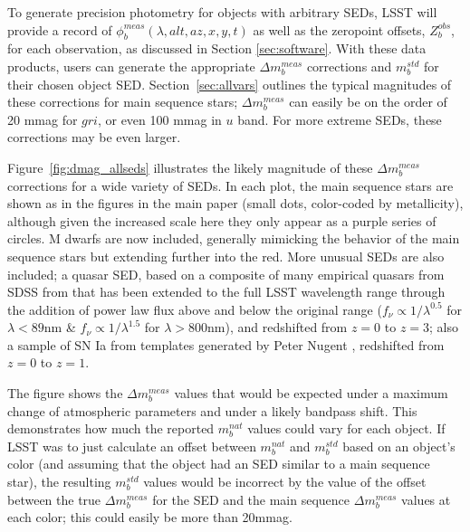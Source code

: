 \documentclass[12pt,preprint]{aastex}
\begin{document}
To generate precision photometry for objects with arbitrary SEDs,
LSST will provide a record of $\phi_b^{meas}(\lambda,alt,az,x,y,t)$ as
well as the zeropoint offsets, $Z_b^{obs}$, for each observation, as
discussed in Section \ref{sec:software}. With
these data products, users can generate the
appropriate $\Delta m_b^{meas}$ corrections and $m_b^{std}$ for their chosen
object SED. Section~\ref{sec:allvars}
outlines the typical magnitudes of these
corrections for main sequence stars; $\Delta m_b^{meas}$ can easily be
on the order of 20 mmag for $gri$, or even 100 mmag in $u$ band. For
more extreme SEDs, these corrections may be even larger.

Figure~\ref{fig:dmag_allseds} illustrates the likely magnitude of
these $\Delta m_b^{meas}$ corrections for a wide variety of SEDs. In
each plot, the main sequence stars are shown as in the figures in the
main paper (small dots, color-coded by metallicity), although given
the increased scale here they only appear as a purple series of
circles. M dwarfs are now included, generally mimicking the behavior
of the main sequence stars but extending further into the red. More
unusual SEDs are also included; a quasar SED, based on a composite of
many empirical quasars from SDSS from \citet{VandenBerk2001} that has
been extended to the full LSST wavelength range through the addition
of power law flux above and below the original range ($f_\nu \propto
1/\lambda^{0.5}$ for $\lambda<89$nm \& $f_\nu \propto 1/\lambda^{1.5}$
for $\lambda>800$nm), and redshifted from $z=0$ to $z=3$; also a
sample of SN Ia from templates generated by Peter Nugent
\citep{Nugent2002}, redshifted from $z=0$ to $z=1$.

The figure shows the $\Delta m_b^{meas}$ values that would be expected
under a maximum change of atmospheric parameters and under a likely
bandpass shift. This demonstrates how much the reported $m_b^{nat}$
values could vary for each object. If LSST was to just calculate an
offset between $m_b^{nat}$ and $m_b^{std}$ based on an object's color
(and assuming that the object had an SED similar to a main sequence
star), the resulting $m_b^{std}$ values would be incorrect by the
value of the offset between the true $\Delta m_b^{meas}$ for the SED
and the main sequence $\Delta m_b^{meas}$ values at each color; this
could easily be more than 20mmag.  
\end{document}
